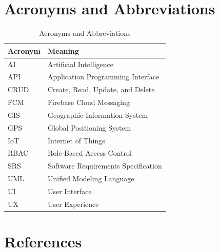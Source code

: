 \section{Acronyms and Abbreviations}
\label{sec:acronyms}

\begin{table}[H]
\centering
\caption{Acronyms and Abbreviations}

\begin{tabularx}{\textwidth}{
    |p{3cm}|
    X|
}

\hline
\textbf{Acronym} &
\textbf{Meaning} \\

\hline
AI & Artificial Intelligence \\

\hline
API & Application Programming Interface \\

\hline
CRUD & Create, Read, Update, and Delete \\

\hline
FCM & Firebase Cloud Messaging \\

\hline
GIS & Geographic Information System \\

\hline
GPS & Global Positioning System \\

\hline
IoT & Internet of Things \\

\hline
RBAC & Role-Based Access Control \\

\hline
SRS & Software Requirements Specification \\

\hline
UML & Unified Modeling Language \\

\hline
UI & User Interface \\

\hline
UX & User Experience \\

\hline

\end{tabularx}
\end{table}

\section{References}
\label{sec:srs-references}

